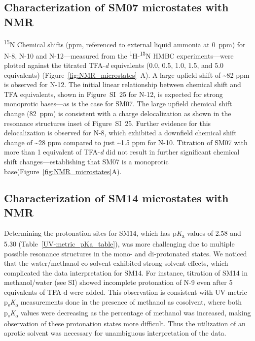 \documentclass[9pt,lineno]{elife}
\newcommand{\pKa}{p\textit{K}\textsubscript{a}}
\newcommand{\psKa}{p\textsubscript{s}\textit{K}\textsubscript{a}}
\begin{document}
\subsection{Characterization of SM07 microstates with NMR}

\textsuperscript{15}N Chemical shifts (ppm, referenced to external liquid ammonia at 0~ppm) for N-8, N-10 and N-12---measured from the \textsuperscript{1}H-\textsuperscript{15}N HMBC experiments---were plotted against the titrated TFA-\textit{d} equivalents (0.0, 0.5, 1.0, 1.5, and 5.0 equivalents) (Figure~\ref{fig:NMR_microstates}~A). 
A large upfield shift of \textasciitilde82 ppm is observed for N-12. 
The initial linear relationship between chemical shift and TFA equivalents, shown in Figure~SI~25 for N-12, is expected for strong monoprotic bases---as is the case for SM07. 
The large upfield chemical shift change (82~ppm) is consistent with a charge delocalization as shown in the resonance structures inset of Figure~SI~25. 
Further evidence for this delocalization is observed for N-8, which exhibited a downfield chemical shift change of \textasciitilde28 ppm compared to just \textasciitilde1.5 ppm for N-10. 
Titration of SM07 with more than 1 equivalent of TFA-\textit{d} did not result in further significant chemical shift changes---establishing that SM07 is a monoprotic base(Figure~\ref{fig:NMR_microstates}A).

\subsection{Characterization of SM14 microstates with NMR}

Determining the protonation sites for SM14, which has \pKa{} values of 2.58 and 5.30 (Table~\ref{UV-metric_pKa_table}), was more challenging due to multiple possible resonance structures in the mono- and di-protonated states. 
We noticed that the water/methanol co-solvent exhibited strong solvent effects, which complicated the data interpretation for SM14. 
For instance, titration of SM14 in methanol/water (see SI) showed incomplete protonation of N-9 even after 5 equivalents of TFA-d were added. 
This observation is consistent with UV-metric \psKa{} measurements done in the presence of methanol as cosolvent, where both \psKa{} values were decreasing as the percentage of methanol was increased, making observation of these protonation states more difficult. 
Thus the utilization of an aprotic solvent was necessary for unambiguous interpretation of the data.
\end{document}
